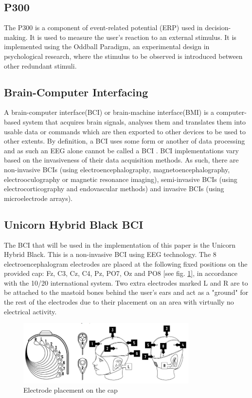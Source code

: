 \subsection{P300}
The P300 is a component of event-related potential (ERP) used in decision-making. It is used to measure the user's reaction to an external stimulus. It is implemented using the Oddball Paradigm, an experimental design in psychological research, where the stimulus to be observed is introduced between other redundant stimuli.

\subsection{Brain-Computer Interfacing}
A brain-computer interface(BCI) or brain-machine interface(BMI) is a computer-based system that acquires brain signals, analyses them and translates them into usable data or commands which are then exported to other devices to be used to other extents. By definition, a BCI uses some form or another of data processing and as such an EEG alone cannot be called a BCI \cite{Shih_2012}. BCI implementations vary based on the invasiveness of their data acquisition methods. As such, there are non-invasive BCIs (using electroencephalography, magnetoencephalography, electrooculography or magnetic resonance imaging), semi-invasive BCIs (using electrocorticography and endovascular methods) and invasive BCIs (using microelectrode arrays).

\subsection{Unicorn Hybrid Black BCI}
The BCI that will be used in the implementation of this paper is the Unicorn Hybrid Black. This is a non-invasive BCI using EEG technology. The 8 electroencephalogram electrodes are placed at the following fixed positions on the provided cap: Fz, C3, Cz, C4, Pz, PO7, Oz and PO8 [see fig. \ref{fig:electrode placement}], in accordance with the 10/20 international system. Two extra electrodes marked L and R are to be attached to the mastoid bones behind the user's ears and act as a "ground" for the rest of the electrodes due to their placement on an area with virtually no electrical activity. 

\begin{figure}
  \centering
  \includegraphics[width=0.8\textwidth]{Graphics/Electrode Placement.png}
  \caption{Electrode placement on the cap}
  \label{fig:electrode placement}
\end{figure}

